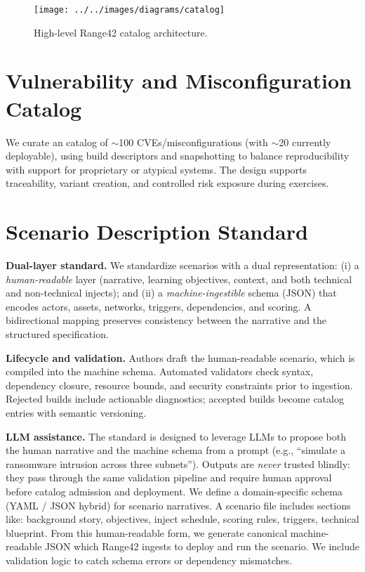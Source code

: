 \documentclass[11pt]{article}
\begin{document}
\begin{figure}[h]
\centering
\texttt{[image: ../../images/diagrams/catalog]}
\caption{High-level Range42 catalog architecture.}
\label{fig:arch_catalog}
\end{figure}

\section{Vulnerability and Misconfiguration Catalog}
We curate an catalog of $\sim$100 CVEs/misconfigurations (with $\sim$20 currently deployable), using build descriptors and snapshotting to balance reproducibility with support for proprietary or atypical systems. The design supports traceability, variant creation, and controlled risk exposure during exercises.

\section{Scenario Description Standard}

\textbf{Dual-layer standard.} We standardize scenarios with a dual representation:
(i) a \emph{human-readable} layer (narrative, learning objectives, context, and both technical and non-technical injects); and
(ii) a \emph{machine-ingestible} schema (JSON) that encodes actors, assets, networks, triggers, dependencies, and scoring.
A bidirectional mapping preserves consistency between the narrative and the structured specification.

\textbf{Lifecycle and validation.} Authors draft the human-readable scenario, which is compiled into the machine schema.
Automated validators check syntax, dependency closure, resource bounds, and security constraints prior to ingestion.
Rejected builds include actionable diagnostics; accepted builds become catalog entries with semantic versioning.

\textbf{LLM assistance.} The standard is designed to leverage LLMs to propose both the human narrative and the machine schema from a prompt (e.g., ``simulate a ransomware intrusion across three subnets'').
Outputs are \emph{never} trusted blindly: they pass through the same validation pipeline and require human approval before catalog admission and deployment.
We define a domain-specific schema (YAML / JSON hybrid) for scenario narratives. A scenario file includes sections like: background story, objectives, inject schedule, scoring rules, triggers, technical blueprint. From this human-readable form, we generate canonical machine-readable JSON which Range42 ingests to deploy and run the scenario. We include validation logic to catch schema errors or dependency mismatches.
\end{document}
